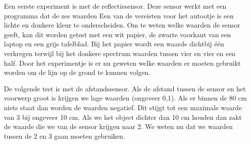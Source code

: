 \documentclass[a4paper,twoside,kulak]{kulakreport} %
\begin{document}
Een eerste experiment is met de reflectiesensor. Deze sensor werkt met een programma dat de zes waarden %
Een van de vereisten voor het autootje is een lichte en donkere kleur te onderscheiden. Om te weten welke waarden de sensor geeft, kan dit worden getest met een wit papier, de zwarte voorkant van een laptop en een grijs tafelblad. Bij het papier wordt een waarde dichtbij één verkregen terwijl bij het donkere spectrum waarden tussen vier en vier en een half. %
Door het experimentje is er nu geweten welke waarden er moeten gebruikt worden om de lijn op de grond te kunnen volgen.

De volgende test is met de afstandssensor. Als de afstand tussen de sensor en het voorwerp groot is krijgen we lage waarden (ongeveer 0,1). Als er binnen de 80 cm niets staat dan worden de waarden negatief. Dit stijgt tot een maximale waarde van 3 bij ongeveer 10 cm. Als we het object dichter dan 10 cm houden dan zakt de waarde die we van de sensor krijgen naar 2. We weten nu dat we waarden tussen de 2 en 3 gaan moeten gebruiken. 


\end{document}
